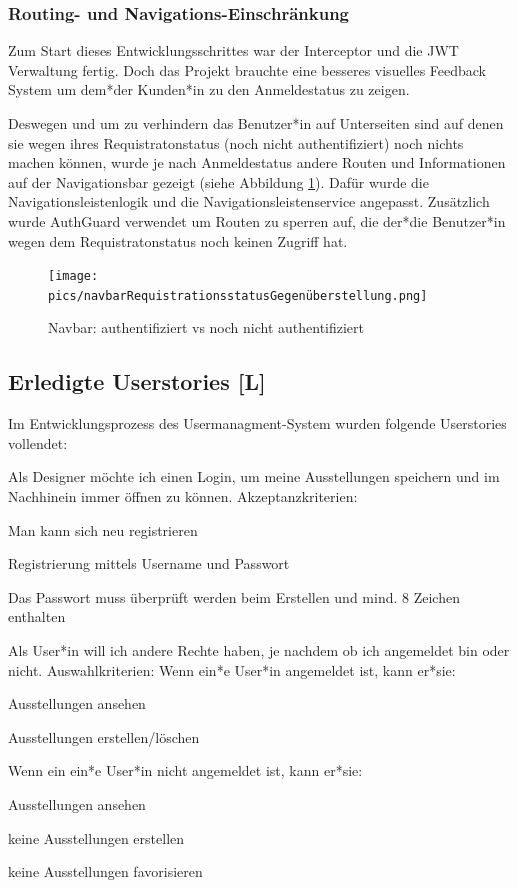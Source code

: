 \subsubsection{Routing- und Navigations-Einschränkung}
Zum Start dieses Entwicklungsschrittes war der Interceptor und die JWT Verwaltung fertig. Doch das Projekt brauchte eine besseres visuelles Feedback System um dem*der Kunden*in zu den Anmeldestatus zu zeigen.

Deswegen und um zu verhindern das Benutzer*in auf Unterseiten sind auf denen sie wegen ihres Requistratonstatus (noch nicht authentifiziert) noch nichts machen können, wurde je nach Anmeldestatus andere Routen und Informationen auf der Navigationsbar gezeigt (siehe Abbildung \ref{fig:impl:navbarvergleich}). Dafür wurde die Navigationsleistenlogik und die Navigationsleistenservice angepasst. Zusätzlich wurde AuthGuard verwendet um Routen zu sperren auf, die der*die Benutzer*in wegen dem Requistratonstatus noch keinen Zugriff hat. 

\begin{figure}
  \centering
  \texttt{[image: pics/navbarRequistrationsstatusGegenüberstellung.png]}
  \caption{Navbar: authentifiziert vs noch nicht authentifiziert}
  \label{fig:impl:navbarvergleich}
\end{figure}


\subsection{Erledigte Userstories [L]}
Im Entwicklungsprozess des Usermanagment-System wurden folgende Userstories vollendet: 
\begin{compactenum}
  \item Als Designer möchte ich einen Login, um meine Ausstellungen speichern und im Nachhinein immer öffnen zu können.
  Akzeptanzkriterien:
  \begin{compactitem}
      \item Man kann sich neu registrieren
      \item Registrierung mittels Username und Passwort
      \item Das Passwort muss überprüft werden beim Erstellen und mind. 8 Zeichen enthalten
  \end{compactitem}
  \item Als User*in will ich andere Rechte haben, je nachdem ob ich angemeldet bin oder nicht. Auswahlkriterien:
  Wenn ein*e User*in angemeldet ist, kann er*sie:
      \begin{compactitem}
          \item Ausstellungen ansehen
          \item Ausstellungen erstellen/löschen
      \end{compactitem}  
  Wenn ein ein*e User*in nicht angemeldet ist, kann er*sie:
      \begin{compactitem}
          \item Ausstellungen ansehen
          \item keine Ausstellungen erstellen
          \item keine Ausstellungen favorisieren
      \end{compactitem} 
\end{compactenum}